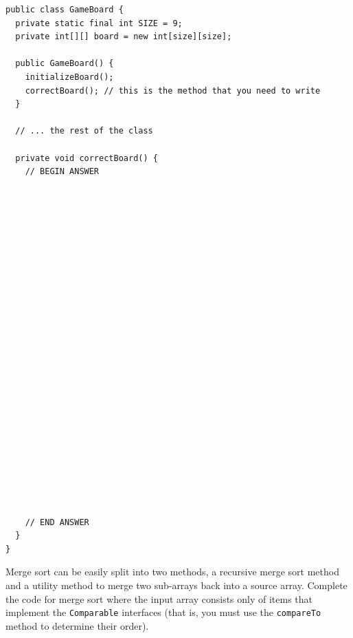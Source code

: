 \documentclass[11pt]{exam}
\begin{document}
\begin{questions}

\newpage
\begin{verbatim}
public class GameBoard {
  private static final int SIZE = 9;
  private int[][] board = new int[size][size];

  public GameBoard() {
    initializeBoard();
    correctBoard(); // this is the method that you need to write
  }

  // ... the rest of the class

  private void correctBoard() {
    // BEGIN ANSWER

























    // END ANSWER
  }
}	
\end{verbatim}

\newpage
\question Merge sort can be easily split into two methods, a recursive merge sort method and a utility method to merge two sub-arrays back into a source array.   Complete the code for merge sort where the input array consists only of items that implement the {\tt Comparable} interfaces (that is, you must use the {\tt compareTo} method to determine their order).
\end{questions}
\end{document}
